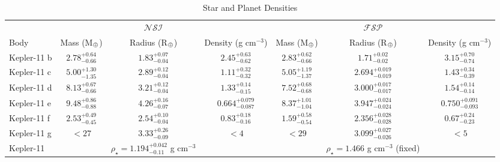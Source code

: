 \documentclass[twocolumn]{aastex61}
\begin{document}
\begin{table}
\caption{Star and Planet Densities}
\label{table:den}
\centering 
\begin{tabular}{l | c c c | c c c} 
\hline
 & & $\mathcal{NSI}$ & & & $\mathcal{FSP}$ &  \\
Body & Mass (M$_\oplus$) & Radius (R$_\oplus$) & Density (g cm$^{-3}$) & Mass (M$_\oplus$) & Radius (R$_\oplus$) & Density (g cm$^{-3}$) \\
\hline
Kepler-11 b & $2.78^{+0.64}_{-0.66}$ & $1.83^{+0.07}_{-0.04} $ & $2.45^{+0.63}_{-0.62} $ & $2.83^{+0.62}_{-0.66}$ & $1.71^{+0.02}_{-0.02}$ & $ 3.15^{+0.70}_{-0.74} $  \\
Kepler-11 c & $5.00^{+1.30}_{-1.35}$ & $2.89^{+0.12}_{-0.04}$ & $1.11^{+0.32}_{-0.32}$ & $5.05^{+1.19}_{-1.37}$ & $2.694^{+0.019}_{-0.019}$ & $ 1.43^{+0.34}_{-0.39} $ \\
Kepler-11 d & $8.13^{+0.67}_{-0.66}$ & $3.21^{+0.12}_{-0.04}$ & $ 1.33^{+0.14}_{-0.15} $ & $7.52^{+0.68}_{-0.68}$ & $3.000^{+0.017}_{-0.017}$ & $ 1.54^{+0.14}_{-0.14} $ \\
Kepler-11 e & $9.48^{+0.86}_{-0.88}$ & $4.26^{+0.16}_{-0.07}$ &  $ 0.664^{+0.079}_{-0.087} $ & $8.37^{+1.01}_{-1.04}$ & $3.947^{+0.024}_{-0.024}$ & $ 0.750^{+0.091}_{-0.093} $ \\
Kepler-11 f & $2.53^{+0.49}_{-0.45}$ & $2.54^{+0.10}_{-0.04}$ & $ 0.83^{+0.18}_{-0.16} $  & $1.59^{+0.58}_{-0.54}$ & $2.356^{+0.028}_{-0.028}$ & $ 0.67^{+0.24}_{-0.23} $  \\
Kepler-11 g & $ <  27$ & $3.33^{+0.26}_{-0.09}$ & $ <  4 $ & $<  29$ & $3.099^{+0.027}_{-0.026}$ & $ < 5 $\\
\hline    
Kepler-11  & & $\rho_{\star} = 1.194^{+0.042}_{-0.11} $ g cm$^{-3}$  & & & $\rho_{\star} = 1.466 $ g cm$^{-3}$ (fixed) & \\
\hline   
\end{tabular}

\end{table}
\end{document}
